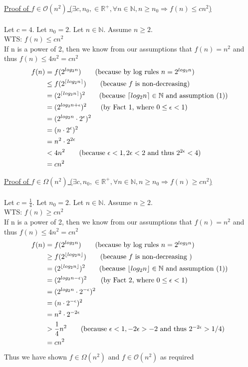 \documentclass[20pt]{article}
\DeclarePairedDelimiter{\ceil}{\lceil}{\rceil}
\DeclarePairedDelimiter\floor{\lfloor}{\rfloor}
\begin{document}
\begin{enumerate}
\underline{Proof of $f\in \mathcal{O}(n^2)$ \Leftrightarrow ($\exists c, n_0, \in \mathbb{R}^+, \forall n \in \mathbb{N}, n \geq n_0 \Rightarrow f(n) \leq cn^2$)}\\\\
Let $c = 4.$ Let $n_0 = 2.$ Let $n \in \mathbb{N}.$ Assume $n \geq 2.$\\
WTS: $f(n) \leq cn^2$\\
If n is a power of 2, then we know from our assumptions that $f(n) = n^2$ and thus $f(n) \leq 4n^2 = cn^2$
\begin{align*}
    f(n) &= f(2^{log_2n}) \tag{because by log rules $n = 2^{log_2n}$}\\
    &\leq f(2^{\ceil[]{log_2n}})\tag{because $f$ is non-decreasing}\\
    &= (2^{\ceil[]{log_2n}})^2 \tag{because $\ceil[]{log_2n} \in \mathbb{N}$ and assumption (1)}\\
    &= (2^{log_2n + \epsilon})^2 \tag{by Fact 1, where $0 \leq \epsilon < 1$} \\
    &= (2^{log_2n} \cdot 2^{\epsilon})^2 \\
    &= (n \cdot 2^{\epsilon})^2\\
    &= n^2 \cdot 2^{2\epsilon}\\
    &< 4n^2 \tag{because $\epsilon < 1, 2\epsilon < 2$ and thus $2^{2\epsilon} < 4$} \\
    &= cn^2
\end{align*}

\underline{Proof of $f\in \Omega(n^2)$ \Leftrightarrow ($\exists c, n_0, \in \mathbb{R}^+, \forall n \in \mathbb{N}, n \geq n_0 \Rightarrow f(n) \geq cn^2$)}\\\\
Let $c = \frac{1}{4}.$ Let $n_0 = 2.$ Let $n \in \mathbb{N}.$ Assume $n \geq 2.$\\
WTS: $f(n) \geq cn^2$\\
If n is a power of 2, then we know from our assumptions that $f(n) = n^2$ and thus $f(n) \leq 4n^2 = cn^2$
\begin{align*}
    f(n) &= f(2^{log_2n}) \tag{because by log rules $n = 2^{log_2n}$}\\
    &\geq f(2^{\floor{log_2n}})\tag{because $f$ is non-decreasing }\\
    &= (2^{\floor{log_2n}})^2 \tag{because $\floor{log_2n} \in \mathbb{N}$ and assumption (1)}\\
    &= (2^{log_2n - \epsilon})^2 \tag{by Fact 2, where $0 \leq \epsilon < 1$} \\
    &= (2^{log_2n} \cdot 2^{-\epsilon})^2 \\
    &= (n \cdot 2^{-\epsilon})^2\\
    &= n^2 \cdot 2^{-2\epsilon}\\
    &> \frac{1}{4}n^2 \tag{because $\epsilon < 1, -2\epsilon > -2$ and thus $2^{-2\epsilon} > 1/4$} \\
    &= cn^2
\end{align*}
Thus we have shown $f\in \Omega(n^2)$ and $f\in \mathcal{O}(n^2)$ as required \hfill \Box
\end{enumerate}
\end{document}
